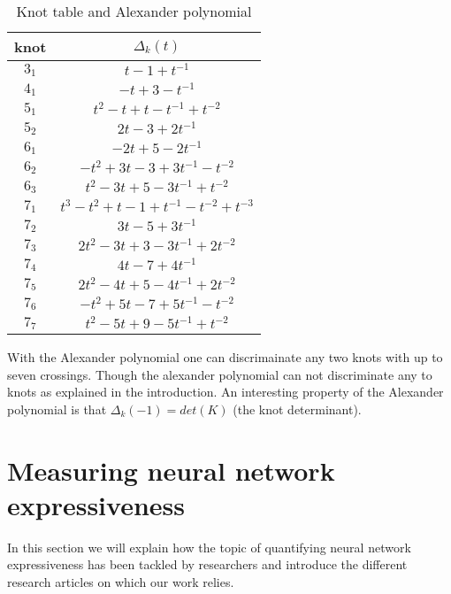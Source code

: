 \documentclass[12pt, a4paper]{article}
\begin{document}
\begin{table}[H]
\begin{center}
  \begin{tabular}{| c | c |}
    \hline
    knot & $\Delta_k(t)$\\
    \hline
    $3_1$ & $t - 1 + t^{-1}$\\
    \hline
    $4_1$ & $-t + 3 -t^{-1}$\\
    \hline
    $5_1$ & $t^2 - t + t - t^{-1} + t^{-2}$\\
    \hline
    $5_2$ & $2t - 3 + 2t^{-1}$\\
    \hline
    $6_1$ & $-2t + 5 -2t^{-1}$\\
    \hline
    $6_2$ & $-t^2 + 3t -3 + 3t^{-1} - t^{-2}$\\
    \hline
    $6_3$ & $t^2 - 3t +5 -3t^{-1} + t^{-2}$\\
    \hline
    $7_1$ & $t^3 - t^2 +t -1 + t^{-1} - t^{-2} + t^{-3}$\\
    \hline
    $7_2$ & $3t -5 + 3t^{-1}$\\
    \hline
    $7_3$ & $2t^2 - 3t + 3 - 3t^{-1} + 2t^{-2}$\\
    \hline
    $7_4$ & $4t -7 + 4t^{-1}$\\
    \hline
    $7_5$ & $2t^2 - 4t + 5 - 4t^{-1} + 2t^{-2}$\\
    \hline
    $7_6$ & $-t^2 +5t -7 +5t^{-1} - t^{-2}$\\
    \hline
    $7_7$ & $t^2 -5t +9 -5t^{-1} + t^{-2}$\\
    \hline
  \end{tabular}
\end{center}
  \caption{Knot table and Alexander polynomial}
\label{tab:knot_alexander}
\end{table}

With the Alexander polynomial one can discrimainate any two knots with up to seven crossings. Though the alexander polynomial can not discriminate any to knots as explained in the introduction. An interesting property of the Alexander polynomial is that $\Delta_k(-1) = det(K)$ (the knot determinant).

\newpage
\thispagestyle{empty}
\mbox{}
\newpage

\section{Measuring neural network expressiveness}

In this section we will explain how the topic of quantifying neural network expressiveness has been tackled by researchers and introduce the different research articles on which our work relies.\\
\end{document}
